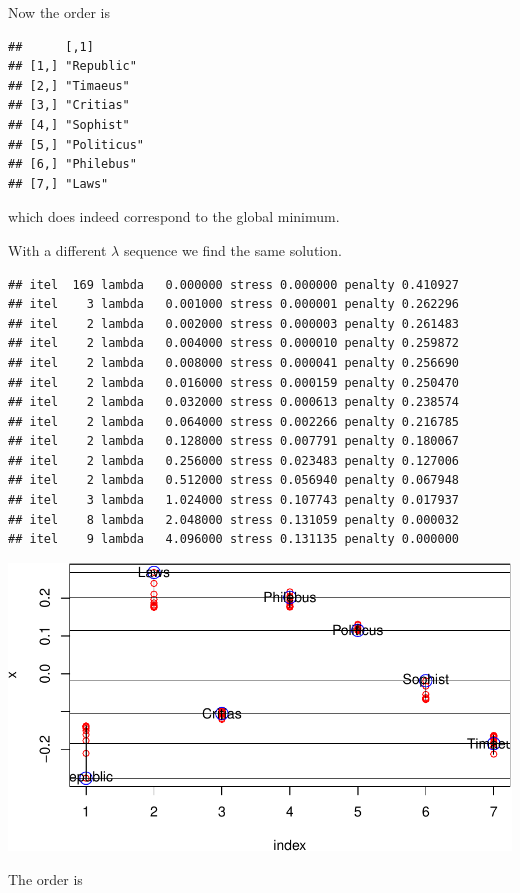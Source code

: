 \documentclass[
  12pt,
]{article}
\begin{document}
Now the order is

\begin{verbatim}
##      [,1]       
## [1,] "Republic" 
## [2,] "Timaeus"  
## [3,] "Critias"  
## [4,] "Sophist"  
## [5,] "Politicus"
## [6,] "Philebus" 
## [7,] "Laws"
\end{verbatim}

which does indeed correspond to the global minimum.

With a different \(\lambda\) sequence we find the same solution.

\begin{verbatim}
## itel  169 lambda   0.000000 stress 0.000000 penalty 0.410927 
## itel    3 lambda   0.001000 stress 0.000001 penalty 0.262296 
## itel    2 lambda   0.002000 stress 0.000003 penalty 0.261483 
## itel    2 lambda   0.004000 stress 0.000010 penalty 0.259872 
## itel    2 lambda   0.008000 stress 0.000041 penalty 0.256690 
## itel    2 lambda   0.016000 stress 0.000159 penalty 0.250470 
## itel    2 lambda   0.032000 stress 0.000613 penalty 0.238574 
## itel    2 lambda   0.064000 stress 0.002266 penalty 0.216785 
## itel    2 lambda   0.128000 stress 0.007791 penalty 0.180067 
## itel    2 lambda   0.256000 stress 0.023483 penalty 0.127006 
## itel    2 lambda   0.512000 stress 0.056940 penalty 0.067948 
## itel    3 lambda   1.024000 stress 0.107743 penalty 0.017937 
## itel    8 lambda   2.048000 stress 0.131059 penalty 0.000032 
## itel    9 lambda   4.096000 stress 0.131135 penalty 0.000000
\end{verbatim}

\begin{center}\includegraphics{penalty_files/figure-latex/plato3-1} \end{center}

The order is
\end{document}
